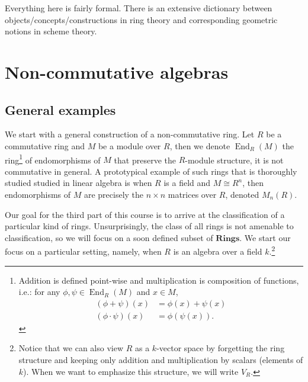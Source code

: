 \documentclass{tufte-handout} %
\theoremstyle{definition}
\theoremstyle{remark}
\DeclareMathOperator{\End}{End}
\begin{document}
Everything here is fairly formal. There is an extensive dictionary between objects/concepts/constructions in ring theory and corresponding geometric notions in scheme theory.

\section{Non-commutative algebras}
\subsection{General examples}
We start with a general construction of a non-commutative ring. Let $R$ be a commutative ring and $M$ be a module over $R$, then we denote $\End_R(M)$ the ring\footnote{Addition is defined point-wise and multiplication is composition of functions, i.e.: for any $\phi, \psi \in \End_R(M)$ and $x \in M$, \begin{align*}	(\phi+\psi)(x) &= \phi(x)+\psi(x)\\(\phi \cdot \psi)(x) &= \phi(\psi(x)).\end{align*}} of endomorphisms of $M$ that preserve the $R$-module structure, it is not commutative in general. A prototypical example of such rings that is thoroughly studied studied in linear algebra is when $R$ is a field and $M \cong R^n$, then endomorphisms of $M$ are precisely the $n\times n$ matrices over $R$, denoted $M_n(R)$.

Our goal for the third part of this course is to arrive at the classification of a particular kind of rings. Unsurprisingly, the class of all rings is not amenable to classification, so we will focus on a soon defined subset of $\textbf{Rings}$. We start our focus on a particular setting, namely, when $R$ is an algebra over a field $k$.\footnote{Notice that we can also view $R$ as a $k$-vector space by forgetting the ring structure and keeping only addition and multiplication by scalars (elements of $k$). When we want to emphasize this structure, we will write $V_R$. }
\end{document}
